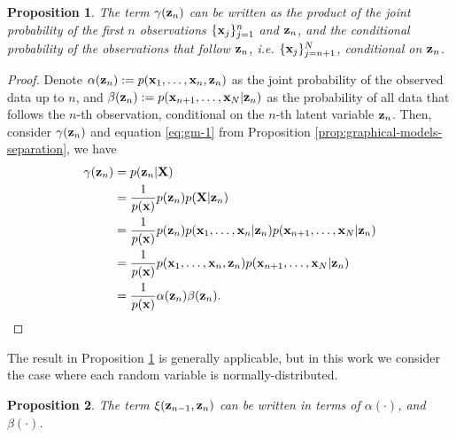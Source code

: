 \documentclass[12pt, oneside]{book}
\numberwithin{equation}{section}
\newcommand{\x}{{\bf x}}
\newcommand{\z}{{\bf z}}
\newtheorem{proposition}{Proposition}[section]
\begin{document}
{\begin{proposition}\label{prop:gamma-factorisation}
	The term $\gamma(\z_n)$ can be written as the product of the joint probability of the first $n$ observations $\{\x_j\}_{j=1}^n$ and $\z_n$, and the conditional probability of the observations that follow $\z_n$, i.e. $\{\x_j\}_{j=n+1}^{N}$, conditional on $\z_n$.
\end{proposition}

\begin{proof}
Denote $\alpha(\z_n) := p(\x_1, \ldots, \x_n, \z_n)$ as the joint probability of the observed data up to $n$, and $\beta(\z_n) := p(\x_{n+1}, \ldots, \x_N\vert \z_n)$ as the probability of all data that follows the $n$-th observation, conditional on the $n$-th latent variable $\z_n$. Then, consider  $\gamma(\z_n)$ and equation \eqref{eq:gm-1} from Proposition \ref{prop:graphical-models-separation}, we have
\begin{align}
	\gamma(\z_n) &= p(\z_n \vert {\bf X})\\
					  &= \frac{1}{p(\x)}p(\z_n)p({\bf X} \vert \z_n)\\
					  &= \frac{1}{p(\x)} p(\z_n) p(\x_1, \ldots, \x_n\vert \z_n) p(\x_{n+1}, \ldots, \x_N\vert \z_n) \label{eq:gamma-part-1}\\
					  &= \frac{1}{p(\x)}p(\x_1, \ldots, \x_n, \z_n) p(\x_{n+1}, \ldots, \x_N\vert \z_n)\\
					  &= \frac{1}{p(\x)}\alpha(\z_n)\beta(\z_n).
\end{align}
\end{proof}

The result in Proposition \ref{prop:gamma-factorisation} is generally applicable, but in this work we consider the case where each random variable is normally-distributed.

\begin{proposition}\label{prop:xi-factorisation}
	The term $\xi(\z_{n-1}, \z_n)$ can be written in terms of $\alpha({\cdot})$, and $\beta(\cdot)$.
\end{proposition}

}
\end{document}
